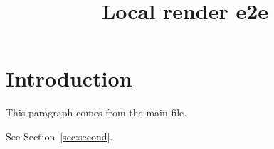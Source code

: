 \documentclass{article}
\title{Local render e2e}
\begin{document}
\maketitle
\section{Introduction}\label{sec:intro}
This paragraph comes from the main file.

See Section~\ref{sec:second}.
\end{document}
